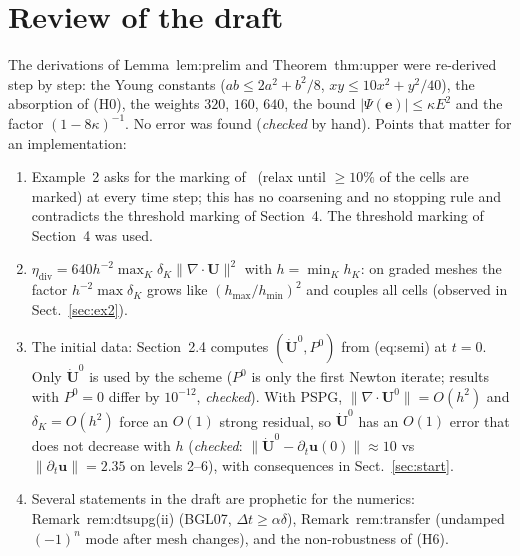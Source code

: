 \documentclass[11pt,a4paper]{article}
\newcommand{\bu}{\boldsymbol{u}}
\newcommand{\bU}{\boldsymbol{U}}
\newcommand{\bud}{\dot{\boldsymbol{U}}}
\newcommand{\dt}{\Delta t}
\newcommand{\be}{\boldsymbol{e}}
\begin{document}
\section{Review of the draft}
The derivations of Lemma~lem:prelim and Theorem~thm:upper were re-derived step by step: the Young constants
($ab\le2a^2+b^2/8$, $xy\le10x^2+y^2/40$), the absorption of (H0), the weights $320$, $160$, $640$, the bound
$|\Psi(\be)|\le\kappa E^2$ and the factor $(1-8\kappa)^{-1}$. No error was found (\emph{checked} by hand).
Points that matter for an implementation:
\begin{enumerate}
\item Example~2 asks for the marking of~\cite[Sect.~4.2]{AAJ27} (relax until $\ge10\%$ of the cells are marked) at every
time step; this has no coarsening and no stopping rule and contradicts the threshold marking of Section~4. The
threshold marking of Section~4 was used.
\item $\eta_{\mathrm{div}}=640h^{-2}\max_K\delta_K\|\nabla\cdot\bU\|^2$ with $h=\min_Kh_K$: on graded meshes the factor
$h^{-2}\max\delta_K$ grows like $(h_{\max}/h_{\min})^2$ and couples all cells (observed in Sect.~\ref{sec:ex2}).
\item The initial data: Section~2.4 computes $(\bud^0,P^0)$ from (eq:semi) at $t=0$. Only $\bud^0$ is used by the scheme
($P^0$ is only the first Newton iterate; results with $P^0=0$ differ by $10^{-12}$, \emph{checked}). With PSPG,
$\|\nabla\cdot\bU^0\|=O(h^2)$ and $\delta_K=O(h^2)$ force an $O(1)$ strong residual, so $\bud^0$ has an $O(1)$ error that does
not decrease with $h$ (\emph{checked}: $\|\bud^0-\partial_t\bu(0)\|\approx10$ vs $\|\partial_t\bu\|=2.35$ on levels 2--6),
with consequences in Sect.~\ref{sec:start}.
\item Several statements in the draft are prophetic for the numerics: Remark~rem:dtsupg(ii) (BGL07, $\dt\ge\alpha\delta$),
Remark~rem:transfer (undamped $(-1)^n$ mode after mesh changes), and the non-robustness of (H6).
\end{enumerate}
\end{document}
